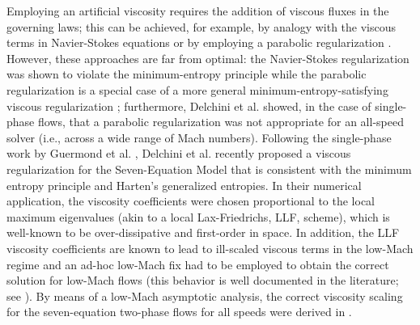 \documentclass[preprint,10pt]{elsarticle}
\begin{document}
Employing an artificial viscosity requires the addition of viscous fluxes in the governing laws; this can be achieved, for example, by analogy with 
the viscous terms in Navier-Stokes equations \cite{references that JLG used in his JCP2011 paper} or by employing a parabolic regularization \cite{PertheneNumMath1996-parabolic}. 
However, these approaches are far from optimal:
the Navier-Stokes regularization was shown to violate the minimum-entropy principle while the parabolic regularization is a special case of a more general
minimum-entropy-satisfying viscous regularization \cite{GuermondSIAM2014}; furthermore, Delchini et al. \cite{DelchiniCompFluid2014-euler} 
showed, in the case of single-phase flows, that a parabolic regularization was not appropriate for an all-speed solver (i.e., across a wide range of Mach numbers).
%
Following the single-phase work by Guermond et al. 
\cite{GuermondSIAM2014, GuermondCSE2011,  GuermondJCP2011, GuermondCRA2008, GuermondSIAM2014}, 
Delchini et al. \cite{Marco_paper_sem} recently proposed a viscous regularization for the Seven-Equation Model that is consistent with the minimum entropy principle and Harten's generalized entropies. In their numerical application, the viscosity coefficients were chosen proportional to the local maximum eigenvalues (akin to a local Lax-Friedrichs, LLF, scheme), which is well-known to be over-dissipative and first-order in space. In addition, the LLF viscosity coefficients are known to
lead to ill-scaled viscous terms in the low-Mach regime and an ad-hoc low-Mach fix had to be employed to obtain the correct solution for low-Mach flows (this 
behavior is well documented in the literature; see \cite{LowMach1, LowMach2, LowMach3}). By means of a low-Mach asymptotic analysis, the correct
viscosity scaling for the seven-equation two-phase flows for all speeds were derived in \cite{Marco_paper_sem}.
\end{document}
